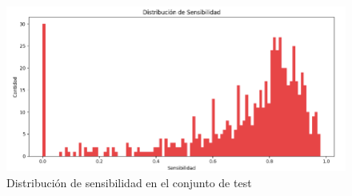 \begin{figure}[H]
	\centering
	\includegraphics[width=0.75\linewidth]{imagenes/dist_sen_test.png}
	\caption{Distribución de sensibilidad en el conjunto de test}
\end{figure}